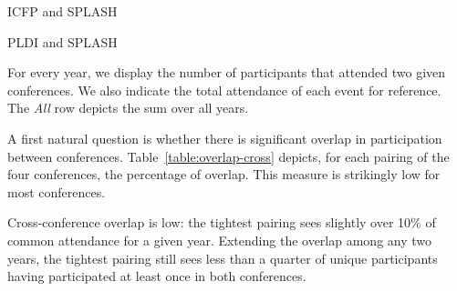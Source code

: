 \begin{table}
  \begin{subtable}[!t]{0.48\textwidth}
    \centering
    \caption{ICFP and SPLASH}
  \end{subtable}
  \hspace{\fill}
  \begin{subtable}[!t]{0.48\textwidth}
    \centering
    \caption{PLDI and SPLASH}
  \end{subtable}
  \caption{For every year, we display the number of participants that attended two given conferences.
    We also indicate the total attendance of each event for reference.
    The \emph{All} row depicts the sum over all years.}
  \label{table:overlap-cross}
\end{table}

A first natural question is whether there is significant overlap
in participation between conferences.
Table~\ref{table:overlap-cross} depicts, for each pairing of the four
conferences, the percentage of overlap. This measure is strikingly
low for most conferences.

\begin{obs}
Cross-conference overlap is low: the tightest pairing sees slightly over
10\% of common attendance for a given year. Extending the overlap among any
two years, the tightest pairing still sees less than a quarter of unique
participants having participated at least once in both conferences.
  \label{obs:overlap-cross}
\end{obs}

